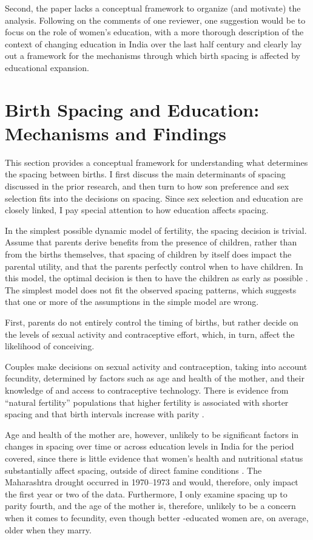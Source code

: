 Second, the paper lacks a conceptual framework to organize (and
motivate) the analysis. Following on the comments of one reviewer, one
suggestion would be to focus on the role of women’s education, with a
more thorough description of the context of changing education in India
over the last half century and clearly lay out a framework for the
mechanisms through which birth spacing is affected by educational
expansion.

\section{Birth Spacing and Education: Mechanisms and Findings}

This section provides a conceptual framework for understanding what determines the  spacing 
between births.
I first discuss the main determinants of spacing discussed in the prior research, and 
then turn to how son preference and sex selection fits into the decisions on spacing.
Since sex selection and education are closely linked, I pay special attention to how education affects spacing.

In the simplest possible dynamic model of fertility, the spacing decision is trivial.
Assume that parents derive benefits from the presence of children, rather than from 
the births themselves, that spacing of children by itself does impact the parental utility, 
and that the parents perfectly control when to have children. 
In this model, the optimal decision is then to have the children as early as possible 
\citep{Newman1988}.
The simplest model does not fit the observed spacing patterns, which suggests 
that one or more of the assumptions in the simple model are wrong.

First, parents do not entirely control the timing of births, but rather decide on the
levels of sexual activity and contraceptive effort, which, in turn, affect the 
likelihood of conceiving.

Couples make decisions on sexual activity and contraception, taking into account fecundity, determined by factors such as age and health of the mother, and their knowledge of and access to contraceptive technology.
There is evidence from ``natural fertility'' populations that higher fertility is associated with shorter spacing and that birth intervals increase 
with parity \citep{Henry1961,Leridon1977}.

Age and health of the mother are, however, unlikely to be significant factors in changes
in spacing over time or across education levels in India for the period covered, since
there is little evidence that women's health and nutritional status substantially affect 
spacing, outside of direct famine conditions \citep{Huffman1987,John1987,lindstrom99}.
The Maharashtra drought occurred in 1970--1973 and would, therefore, only impact the first
year or two of the data.
Furthermore, I only examine spacing up to parity fourth, and the age of the mother is,
therefore, unlikely to be a concern when it comes to fecundity, even though better -educated women are, on average, older when they marry. 

